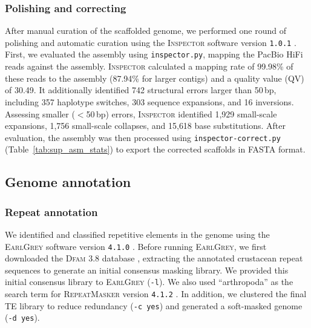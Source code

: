\subsubsection*{Polishing and correcting}

After manual curation of the scaffolded genome, we performed one round of polishing and
automatic curation using the \textsc{Inspector} software version \texttt{1.0.1}
\citep{chen_accurate_2021}. First, we evaluated the assembly using \texttt{inspector.py},
mapping the PacBio HiFi reads against the assembly.
\textsc{Inspector} calculated a mapping rate of 99.98\% of these reads to the assembly
(87.94\% for larger contigs) and a quality value (QV) of 30.49.
It additionally identified 742 structural errors larger than 50\,bp, including
357 haplotype switches, 303 sequence expansions, and 16 inversions.
Assessing smaller ($<$50\,bp) errors, \textsc{Inspector} identified 1{,}929 small-scale
expansions, 1{,}756 small-scale collapses, and 15{,}618 base substitutions.
After evaluation, the assembly was then processed using \texttt{inspector-correct.py}
(Table~\ref{tab:sup_asm_stats}) to export the corrected scaffolds in FASTA format.

\subsection*{Genome annotation}\label{sec:methods_annotation}

\subsubsection*{Repeat annotation}

We identified and classified repetitive elements in the \bgla{} genome
using the \textsc{EarlGrey} software version \texttt{4.1.0} \citep{baril_earl_2024}.
Before running \textsc{EarlGrey}, we first downloaded the \textsc{Dfam 3.8} database
\citep{storer_dfam_2021}, extracting the annotated crustacean repeat sequences to generate
an initial consensus masking library. We provided this initial consensus library to
\textsc{EarlGrey} (\texttt{-l}). We also used ``arthropoda'' as the search term for
\textsc{RepeatMasker} version \texttt{4.1.2} \citep{smit_repeatmasker_2013}. In addition,
we clustered the final TE library to reduce redundancy (\texttt{-c yes}) and generated a
soft-masked genome (\texttt{-d yes}).
\vspace{0.1cm}

